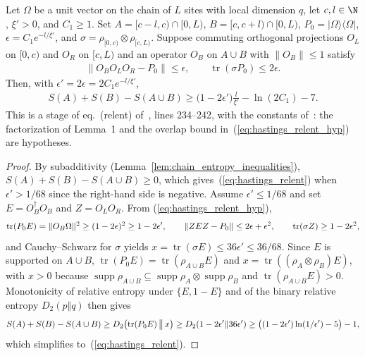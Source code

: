 \begin{lemma}
    \label{thm:hastings_relent_projector}
    \leanok
    Let $\Omega$ be a unit vector on the chain of $L$ sites with local
    dimension $q$, let $c,l\in\N$, $\xi'>0$, and $C_1\ge1$. Set
    $A=\lbrack c-l,c)\cap\lbrack0,L)$, $B=\lbrack c,c+l)\cap\lbrack0,L)$,
    $P_0=|\Omega\rangle\langle\Omega|$, $\epsilon=C_1e^{-l/\xi'}$, and
    $\sigma=\rho_{\lbrack0,c)}\otimes\rho_{\lbrack c,L)}$. Suppose commuting orthogonal
    projections $O_L$ on $\lbrack0,c)$ and $O_R$ on $\lbrack c,L)$ and an operator $O_B$ on
    $A\cup B$ with $\|O_B\|\le1$ satisfy
    \begin{align}
        \|O_BO_LO_R-P_0\|\le\epsilon,\qquad
        \operatorname{tr}(\sigma P_0)\le2\epsilon.
        \label{eq:hastings_relent_hyp}
    \end{align}
    Then, with $\epsilon'=2\epsilon=2C_1e^{-l/\xi'}$,
    \begin{align}
        S(A)+S(B)-S(A\cup B)\ge\bigl(1-2\epsilon'\bigr)\frac{l}{\xi'}
        -\ln(2C_1)-7.
        \label{eq:hastings_relent}
    \end{align}
    This is a stage of eq.~(relent) of~\cite{Hastings2007AreaLaw},
    lines 234--242, with the constants
    of~\cite{gap:hastings07_relent_constants}: the factorization of Lemma~1
    and the overlap bound in~(\ref{eq:hastings_relent_hyp}) are hypotheses.
\end{lemma}
\begin{proof}\leanok
    By subadditivity (Lemma~\ref{lem:chain_entropy_inequalities}),
    $S(A)+S(B)-S(A\cup B)\ge0$, which gives~(\ref{eq:hastings_relent}) when
    $\epsilon'>1/68$ since the right-hand side is negative. Assume
    $\epsilon'\le1/68$ and set $E=O_B^\dagger O_B$ and $Z=O_LO_R$. From
    (\ref{eq:hastings_relent_hyp}),
    \begin{align}
        \operatorname{tr}(P_0 E)=\|O_B\Omega\|^2\ge(1-2\epsilon)^2\ge1-2\epsilon',
        \qquad
        \|ZEZ-P_0\|\le2\epsilon+\epsilon^2,\qquad
        \operatorname{tr}(\sigma Z)\ge1-2\epsilon^2,
        \notag
    \end{align}
    and Cauchy--Schwarz for $\sigma$ yields
    $x=\operatorname{tr}(\sigma E)\le36\epsilon'\le36/68$. Since $E$ is
    supported on $A\cup B$, $\operatorname{tr}(P_0 E)=\operatorname{tr}(\rho_{A\cup B}E)$
    and $x=\operatorname{tr}((\rho_A\otimes\rho_B)E)$, with $x>0$ because
    $\operatorname{supp}\rho_{A\cup B}\subseteq\operatorname{supp}\rho_A\otimes\operatorname{supp}\rho_B$
    and $\operatorname{tr}(\rho_{A\cup B}E)>0$. Monotonicity of relative
    entropy under $\{E,1-E\}$ and of the binary relative entropy $D_2(p\Vert q)$
    then gives
    \begin{align}
        S(A)+S(B)-S(A\cup B)
        \ge D_2\bigl(\operatorname{tr}(P_0 E)\,\big\Vert\,x\bigr)
        \ge D_2(1-2\epsilon'\Vert 36\epsilon')
        \ge\bigl((1-2\epsilon')\ln(1/\epsilon')-5\bigr)-1,
        \notag
    \end{align}
    which simplifies to~(\ref{eq:hastings_relent}).
\end{proof}

